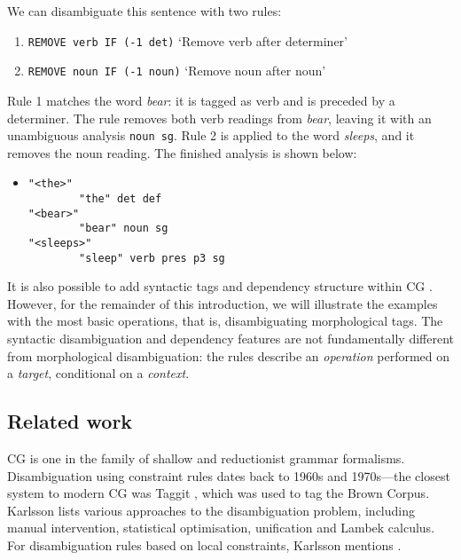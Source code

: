 \noindent We can disambiguate this sentence with two rules:

\begin{enumerate}
\def\labelenumi{\arabic{enumi}.}
\itemsep1pt\parskip0pt
\item \texttt{REMOVE verb IF (-1 det)}
  `Remove verb after determiner'
\item  \texttt{REMOVE noun IF (-1 noun)}
  `Remove noun after noun'
\end{enumerate}

\noindent Rule 1 matches the word \emph{bear}: it is tagged as verb and is
preceded by a determiner. The rule removes both verb readings from
\emph{bear}, leaving it with an unambiguous analysis \texttt{noun sg}.
Rule 2 is applied to the word \emph{sleeps}, and it removes the noun
reading. The finished analysis is shown below:

\begin{itemize}
\item[] 
\begin{verbatim}
"<the>"
        "the" det def
"<bear>"
        "bear" noun sg
"<sleeps>"
        "sleep" verb pres p3 sg
\end{verbatim}
\end{itemize}

It is also possible to add syntactic tags and dependency structure within CG \cite{vislcg3,bick2015}.
However, for the remainder of this introduction, we will illustrate the examples with the 
most basic operations, that is, disambiguating morphological tags.
The syntactic disambiguation and dependency features are not fundamentally
different from morphological disambiguation: the rules describe an \emph{operation}
performed on a \emph{target}, conditional on a \emph{context}.

\subsection{Related work}

CG is one in the family of shallow and reductionist grammar formalisms. Disambiguation using constraint rules dates back to 1960s and 1970s---the closest system to modern CG was Taggit \cite{taggit}, which was used to tag the Brown Corpus.
Karlsson \cite{karlsson1995constraint} lists various approaches to the disambiguation 
problem, including manual intervention, statistical optimisation, unification and Lambek calculus. 
For disambiguation rules based on local constraints, Karlsson mentions \cite{hindle1989disamrules,herz1991local}.

